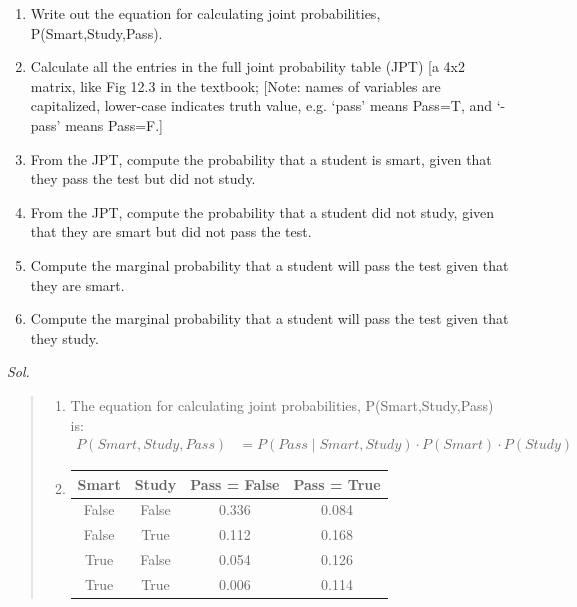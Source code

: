 \documentclass{article}
\theoremstyle{definition}
\newcommand{\<}{\langle}
\renewcommand{\>}{\rangle}
\begin{document}
\begin{enumerate}[label=\textbf{\Alph*}]
    \begin{enumerate}[label=(\alph*)]
        \item Write out the equation for calculating joint probabilities, P(Smart,Study,Pass).
        \item Calculate all the entries in the full joint probability table (JPT) [a 4x2 matrix, like Fig 12.3 in the textbook; [Note: names of variables are capitalized, lower-case indicates truth value, e.g. ‘pass’ means Pass=T, and ‘-pass’ means Pass=F.]
        \item From the JPT, compute the probability that a student is smart, given that they pass the test but did not study.
        \item From the JPT, compute the probability that a student did not study, given that they are smart but did not pass the test.
        \item Compute the marginal probability that a student will pass the test given that they are smart.
        \item Compute the marginal probability that a student will pass the test given that they study.
    \end{enumerate}
      \vspace{1em} 
      \textit{ Sol. }
      \vspace{1em}
      \begin{quote}
        \begin{enumerate}[label=(\alph*)]
        \item The equation for calculating joint probabilities, P(Smart,Study,Pass) is:
        \begin{align*}
          P(Smart, Study, Pass) &= P(Pass \mid Smart, Study) \cdot P(Smart) \cdot P(Study)
        \end{align*}
        \item 
            \begin{table}[h!]
            \centering
            \begin{tabular}{|c|c|c|c|}
            \hline
            \textbf{Smart} & \textbf{Study} & \textbf{Pass = False} & \textbf{Pass = True} \\
            \hline
            False & False & 0.336 & 0.084 \\
            \hline
            False & True & 0.112 & 0.168 \\
            \hline
            True & False & 0.054 & 0.126 \\
            \hline
            True & True & 0.006 & 0.114 \\
            \hline
            \end{tabular}
            \end{table}
    

\end{enumerate}
\end{quote}
\end{enumerate}
\end{document}
